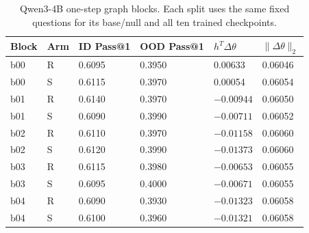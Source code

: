 \begin{table}[H]
\caption{Qwen3-4B one-step graph blocks. Each split uses the same fixed questions for its base/null and all ten trained checkpoints.}
\label{tab:one-step-blocks-graph_unaudited_qwen3-4b}
\centering\small\setlength{\tabcolsep}{3pt}
\begin{tabular}{@{}llllll@{}}
\toprule
Block & Arm & ID Pass@1 & OOD Pass@1 & $h^T\Delta\theta$ & $\|\Delta\theta\|_2$\\
\midrule
b00 & R & 0.6095 & 0.3950 & 0.00633 & 0.06046\\
b00 & S & 0.6115 & 0.3970 & 0.00054 & 0.06054\\
b01 & R & 0.6140 & 0.3970 & $-0.00944$ & 0.06050\\
b01 & S & 0.6090 & 0.3990 & $-0.00711$ & 0.06052\\
b02 & R & 0.6110 & 0.3970 & $-0.01158$ & 0.06060\\
b02 & S & 0.6120 & 0.3990 & $-0.01373$ & 0.06060\\
b03 & R & 0.6115 & 0.3980 & $-0.00653$ & 0.06055\\
b03 & S & 0.6095 & 0.4000 & $-0.00671$ & 0.06055\\
b04 & R & 0.6090 & 0.3930 & $-0.01323$ & 0.06058\\
b04 & S & 0.6100 & 0.3960 & $-0.01321$ & 0.06058\\
\bottomrule
\end{tabular}
\end{table}
